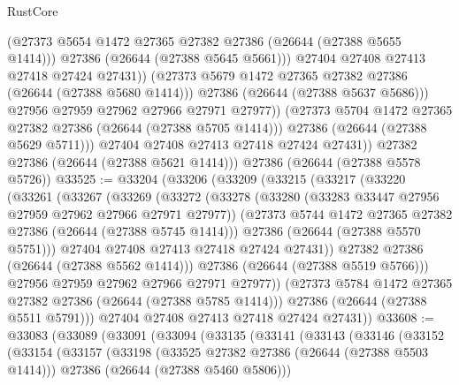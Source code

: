 \begin{lexlean}{RustCore}
\begin{coremodule}
                        (@27373 @5654 @1472 @27365 @27382 @27386 (@26644 (@27388 @5655 @1414)))
                        @27386
                        (@26644 (@27388 @5645 @5661)))
                      @27404
                      @27408
                      @27413
                      @27418
                      @27424
                      @27431))
                  (@27373 @5679 @1472 @27365 @27382 @27386 (@26644 (@27388 @5680 @1414)))
                  @27386
                  (@26644 (@27388 @5637 @5686)))
                @27956
                @27959
                @27962
                @27966
                @27971
                @27977))
            (@27373 @5704 @1472 @27365 @27382 @27386 (@26644 (@27388 @5705 @1414)))
            @27386
            (@26644 (@27388 @5629 @5711)))
          @27404
          @27408
          @27413
          @27418
          @27424
          @27431))
      @27382
      @27386
      (@26644 (@27388 @5621 @1414)))
    @27386
    (@26644 (@27388 @5578 @5726))
@33525 := @33204
    (@33206
      (@33209
        (@33215
          (@33217
            (@33220
              (@33261
                (@33267
                  (@33269
                    (@33272
                      (@33278
                        (@33280 (@33283 @33447 @27956 @27959 @27962 @27966 @27971 @27977))
                        (@27373 @5744 @1472 @27365 @27382 @27386 (@26644 (@27388 @5745 @1414)))
                        @27386
                        (@26644 (@27388 @5570 @5751)))
                      @27404
                      @27408
                      @27413
                      @27418
                      @27424
                      @27431))
                  @27382
                  @27386
                  (@26644 (@27388 @5562 @1414)))
                @27386
                (@26644 (@27388 @5519 @5766)))
              @27956
              @27959
              @27962
              @27966
              @27971
              @27977))
          (@27373 @5784 @1472 @27365 @27382 @27386 (@26644 (@27388 @5785 @1414)))
          @27386
          (@26644 (@27388 @5511 @5791)))
        @27404
        @27408
        @27413
        @27418
        @27424
        @27431))
@33608 := @33083
    (@33089
      (@33091
        (@33094
          (@33135
            (@33141
              (@33143
                (@33146
                  (@33152
                    (@33154
                      (@33157
                        (@33198
                          (@33525 @27382 @27386 (@26644 (@27388 @5503 @1414)))
                          @27386
                          (@26644 (@27388 @5460 @5806)))

\end{coremodule}
\end{lexlean}
